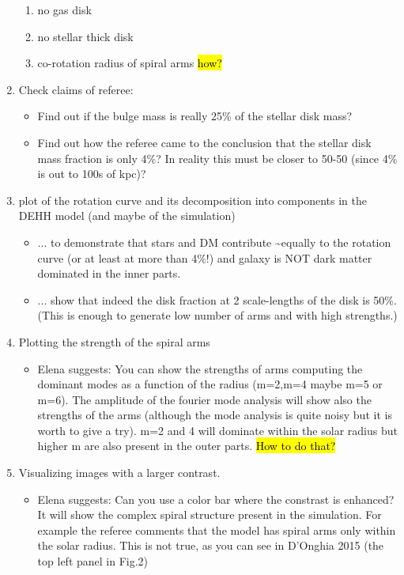 \documentclass[10pt,a4paper]{article}
\begin{document}
\begin{enumerate}
\begin{enumerate}
\item no gas disk
\item no stellar thick disk
\item co-rotation radius of spiral arms \hl{how?}
\end{enumerate}
\item Check claims of referee:
\begin{itemize}
\item Find out if the bulge mass is really 25\% of the stellar disk mass?
\item Find out how the referee came to the conclusion that the stellar disk mass fraction is only 4\%? In reality this must be closer to 50-50 (since 4\% is out to 100s of kpc)?
\end{itemize}
\item plot of the rotation curve and its decomposition into components in the DEHH model (and maybe of the simulation)
\begin{itemize}
\item ... to demonstrate that stars and DM contribute \textasciitilde equally to the rotation curve (or at least at more than 4\%!) and galaxy is NOT dark matter dominated in the inner parts. 
\item ... show that indeed the disk fraction at 2 scale-lengths of the disk is 50\%. (This is enough to generate low number of arms and with high strengths.)
\end{itemize}
\item Plotting the strength of the spiral arms
\begin{itemize}
\item Elena suggests: You can show the strengths of arms computing the dominant modes as a 
function of the radius (m=2,m=4 maybe m=5 or m=6). The amplitude of the 
fourier mode analysis will show also the strengths of the arms (although 
the mode analysis is quite noisy but it is worth to give a try). m=2 and 
4 will dominate within the solar radius but higher m are also present in 
the outer parts. \hl{How to do that?}
\end{itemize}
\item Visualizing images with a larger contrast. 
\begin{itemize} 
\item Elena suggests: Can you use a color bar 
where the constrast is enhanced? It will show the complex spiral 
structure present in the simulation. For example the referee comments 
that the model has spiral arms only within the solar radius. This is not 
true, as you can see in D'Onghia 2015 (the top left panel in Fig.2) 

\end{itemize}
\end{enumerate}
\end{document}

